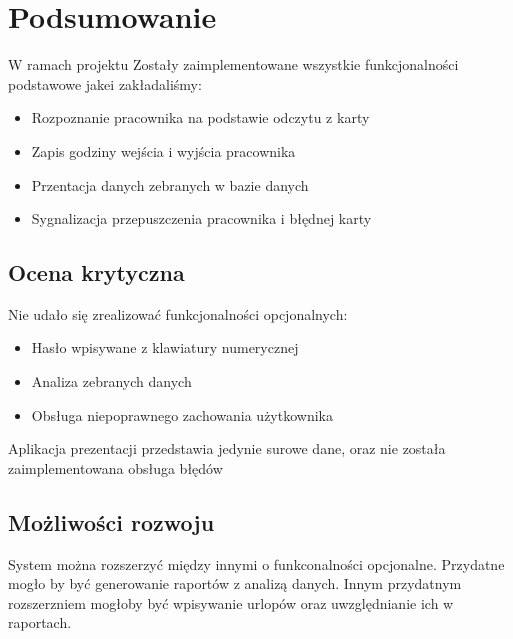 \chapter{Podsumowanie}
W ramach projektu Zostały zaimplementowane wszystkie funkcjonalności podstawowe jakei zakładaliśmy:
\begin{itemize}
\item Rozpoznanie pracownika na podstawie odczytu z karty
\item Zapis godziny wejścia i wyjścia pracownika
\item Przentacja danych zebranych w bazie danych
\item Sygnalizacja przepuszczenia pracownika i błędnej karty
\end{itemize}
\section{Ocena krytyczna}
Nie udało się zrealizować funkcjonalności opcjonalnych:
\begin{itemize}
\item Hasło wpisywane z klawiatury numerycznej
\item Analiza zebranych danych
\item Obsługa niepoprawnego zachowania użytkownika
\end{itemize}
Aplikacja prezentacji przedstawia jedynie surowe dane, oraz nie została zaimplementowana obsługa błędów
\section{Możliwości rozwoju}
System można rozszerzyć między innymi o funkconalności opcjonalne. Przydatne mogło by być generowanie  raportów z analizą danych. Innym przydatnym rozszerzniem mogłoby być wpisywanie urlopów oraz uwzględnianie ich w raportach.
